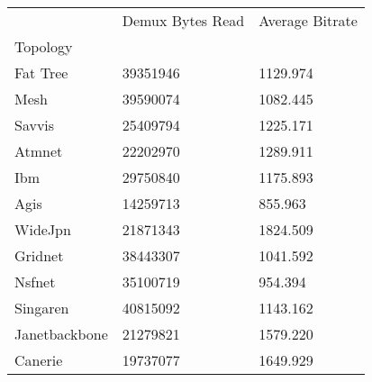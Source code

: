 \begin{tabular}{lll}
 & Demux Bytes Read & Average Bitrate \\
Topology &  &  \\
Fat Tree & 39351946 & 1129.974 \\
Mesh & 39590074 & 1082.445 \\
Savvis & 25409794 & 1225.171 \\
Atmnet & 22202970 & 1289.911 \\
Ibm & 29750840 & 1175.893 \\
Agis & 14259713 & 855.963 \\
WideJpn & 21871343 & 1824.509 \\
Gridnet & 38443307 & 1041.592 \\
Nsfnet & 35100719 & 954.394 \\
Singaren & 40815092 & 1143.162 \\
Janetbackbone & 21279821 & 1579.220 \\
Canerie & 19737077 & 1649.929 \\
\end{tabular}
